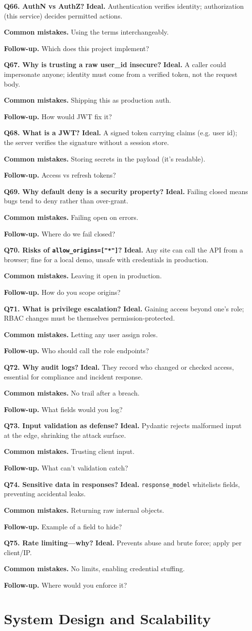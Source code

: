 \documentclass[11pt,a4paper]{report}
\newcommand{\qa}[3]{%
  \textbf{Ideal.} #1\par
  \textbf{Common mistakes.} #2\par
  \textbf{Follow-up.} #3\par
  \vspace{4pt}
}
\begin{document}
\textbf{Q66. AuthN vs AuthZ?}
\qa{Authentication verifies identity; authorization (this service) decides
permitted actions.}
{Using the terms interchangeably.}
{Which does this project implement?}

\textbf{Q67. Why is trusting a raw user\_id insecure?}
\qa{A caller could impersonate anyone; identity must come from a verified token,
not the request body.}
{Shipping this as production auth.}
{How would JWT fix it?}

\textbf{Q68. What is a JWT?}
\qa{A signed token carrying claims (e.g. user id); the server verifies the
signature without a session store.}
{Storing secrets in the payload (it's readable).}
{Access vs refresh tokens?}

\textbf{Q69. Why default deny is a security property?}
\qa{Failing closed means bugs tend to deny rather than over-grant.}
{Failing open on errors.}
{Where do we fail closed?}

\textbf{Q70. Risks of \texttt{allow\_origins=["*"]}?}
\qa{Any site can call the API from a browser; fine for a local demo, unsafe with
credentials in production.}
{Leaving it open in production.}
{How do you scope origins?}

\textbf{Q71. What is privilege escalation?}
\qa{Gaining access beyond one's role; RBAC changes must be themselves
permission-protected.}
{Letting any user assign roles.}
{Who should call the role endpoints?}

\textbf{Q72. Why audit logs?}
\qa{They record who changed or checked access, essential for compliance and
incident response.}
{No trail after a breach.}
{What fields would you log?}

\textbf{Q73. Input validation as defense?}
\qa{Pydantic rejects malformed input at the edge, shrinking the attack surface.}
{Trusting client input.}
{What can't validation catch?}

\textbf{Q74. Sensitive data in responses?}
\qa{\texttt{response\_model} whitelists fields, preventing accidental leaks.}
{Returning raw internal objects.}
{Example of a field to hide?}

\textbf{Q75. Rate limiting---why?}
\qa{Prevents abuse and brute force; apply per client/IP.}
{No limits, enabling credential stuffing.}
{Where would you enforce it?}

\section{System Design and Scalability}
\end{document}
